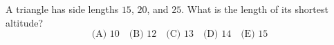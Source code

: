 A triangle has side lengths $15$, $20$, and $25$. What is the length of its shortest altitude?
\[
\text{(A) }10\quad\text{(B) }12\quad\text{(C) }13\quad\text{(D) }14\quad\text{(E) }15
\]
